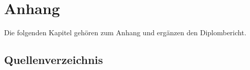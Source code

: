 \section{Anhang}
Die folgenden Kapitel gehören zum Anhang und ergänzen den Diplombericht.


\clearpage
\renewcommand{\refname}{Literaturverzeichnis}
\subsection{Quellenverzeichnis}

\newpage








 
 